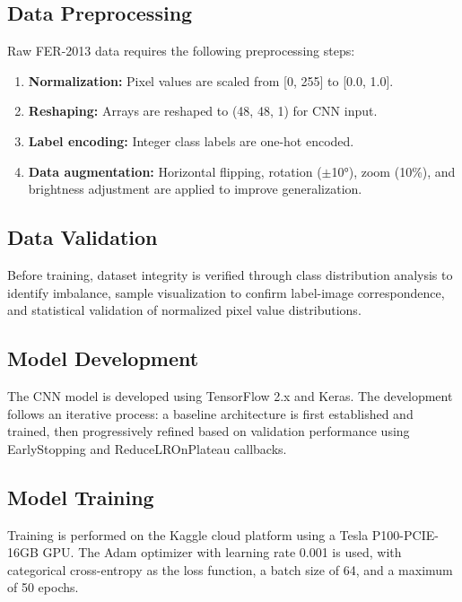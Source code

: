 \documentclass[a4paper,12pt,oneside]{report}
\begin{document}
\subsection{Data Preprocessing}

Raw FER-2013 data requires the following preprocessing steps:

\begin{enumerate}
    \item \textbf{Normalization:} Pixel values are scaled from [0, 255] to [0.0, 1.0].
    \item \textbf{Reshaping:} Arrays are reshaped to (48, 48, 1) for CNN input.
    \item \textbf{Label encoding:} Integer class labels are one-hot encoded.
    \item \textbf{Data augmentation:} Horizontal flipping, rotation ($\pm$10°),
    zoom (10\%), and brightness adjustment are applied to improve generalization.
\end{enumerate}

\subsection{Data Validation}

Before training, dataset integrity is verified through class distribution analysis
to identify imbalance, sample visualization to confirm label-image correspondence,
and statistical validation of normalized pixel value distributions.

\subsection{Model Development}

The CNN model is developed using TensorFlow 2.x and Keras. The development follows
an iterative process: a baseline architecture is first established and trained,
then progressively refined based on validation performance using EarlyStopping and
ReduceLROnPlateau callbacks.

\subsection{Model Training}

Training is performed on the Kaggle cloud platform using a Tesla P100-PCIE-16GB
GPU. The Adam optimizer with learning rate 0.001 is used, with categorical
cross-entropy as the loss function, a batch size of 64, and a maximum of 50 epochs.
\end{document}
